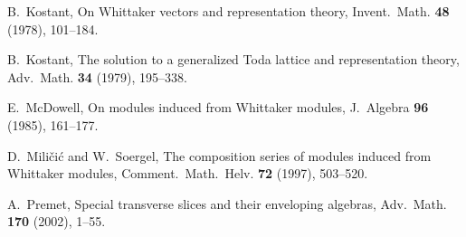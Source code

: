 \documentclass[11pt]{article}
\numberwithin{equation}{section}
\begin{document}
\begin{thebibliography}{}
 B.~Kostant, On Whittaker vectors and representation theory, Invent.~Math. {\bf 48} (1978), 101--184.
  
 B.~Kostant, The solution to a generalized Toda lattice and representation theory, Adv.~Math. {\bf 34} (1979), 195--338.





  



 E.~McDowell, On modules induced from Whittaker modules, J.~Algebra {\bf 96} (1985), 161--177.
  
 D.~Mili\v{c}i\'c and W.~Soergel, The composition series of modules induced from Whittaker modules, Comment.~Math.~Helv. {\bf 72} (1997), 503--520.
  




 A.~Premet, Special transverse slices and their enveloping algebras, Adv.~Math. {\bf 170} (2002), 1--55.
  

\end{thebibliography}
\end{document}
